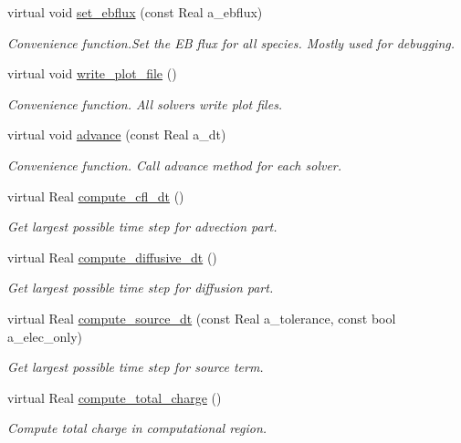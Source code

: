 \begin{DoxyCompactItemize}
virtual void \hyperlink{classcdr__layout_a9f66afbf777b1846ee5353b6afac198c}{set\+\_\+ebflux} (const Real a\+\_\+ebflux)
\begin{DoxyCompactList}\small\item\em Convenience function.\+Set the EB flux for all species. Mostly used for debugging. \end{DoxyCompactList}\item 
virtual void \hyperlink{classcdr__layout_a3ee29c0f0bbdb06169bc6db1aed99371}{write\+\_\+plot\+\_\+file} ()
\begin{DoxyCompactList}\small\item\em Convenience function. All solvers write plot files. \end{DoxyCompactList}\item 
virtual void \hyperlink{classcdr__layout_a2fd0ca1a9c5a57586be1c75fbac63ad2}{advance} (const Real a\+\_\+dt)
\begin{DoxyCompactList}\small\item\em Convenience function. Call advance method for each solver. \end{DoxyCompactList}\item 
virtual Real \hyperlink{classcdr__layout_ab36f0a257fc2652abe852580f1b0f779}{compute\+\_\+cfl\+\_\+dt} ()
\begin{DoxyCompactList}\small\item\em Get largest possible time step for advection part. \end{DoxyCompactList}\item 
virtual Real \hyperlink{classcdr__layout_ada1f0899c73c7030a3c700734db5a1da}{compute\+\_\+diffusive\+\_\+dt} ()
\begin{DoxyCompactList}\small\item\em Get largest possible time step for diffusion part. \end{DoxyCompactList}\item 
virtual Real \hyperlink{classcdr__layout_a74bcdeac88c7f54dd9253165f3014b4b}{compute\+\_\+source\+\_\+dt} (const Real a\+\_\+tolerance, const bool a\+\_\+elec\+\_\+only)
\begin{DoxyCompactList}\small\item\em Get largest possible time step for source term. \end{DoxyCompactList}\item 
virtual Real \hyperlink{classcdr__layout_ade2df5935a458da980cdd05ffeeb52a3}{compute\+\_\+total\+\_\+charge} ()
\begin{DoxyCompactList}\small\item\em Compute total charge in computational region. \end{DoxyCompactList}\item 

\end{DoxyCompactItemize}
